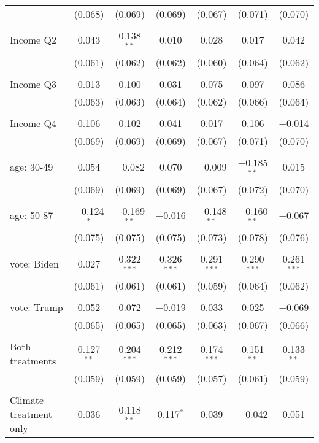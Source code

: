 \begin{tabular}{@{\extracolsep{5pt}}lcccccc}
  & (0.068) & (0.069) & (0.069) & (0.067) & (0.071) & (0.070) \\ 
  & & & & & & \\ 
 Income Q2 & 0.043 & 0.138$^{**}$ & 0.010 & 0.028 & 0.017 & 0.042 \\ 
  & (0.061) & (0.062) & (0.062) & (0.060) & (0.064) & (0.062) \\ 
  & & & & & & \\ 
 Income Q3 & 0.013 & 0.100 & 0.031 & 0.075 & 0.097 & 0.086 \\ 
  & (0.063) & (0.063) & (0.064) & (0.062) & (0.066) & (0.064) \\ 
  & & & & & & \\ 
 Income Q4 & 0.106 & 0.102 & 0.041 & 0.017 & 0.106 & $-$0.014 \\ 
  & (0.069) & (0.069) & (0.069) & (0.067) & (0.071) & (0.070) \\ 
  & & & & & & \\ 
 age: 30-49 & 0.054 & $-$0.082 & 0.070 & $-$0.009 & $-$0.185$^{**}$ & 0.015 \\ 
  & (0.069) & (0.069) & (0.069) & (0.067) & (0.072) & (0.070) \\ 
  & & & & & & \\ 
 age: 50-87 & $-$0.124$^{*}$ & $-$0.169$^{**}$ & $-$0.016 & $-$0.148$^{**}$ & $-$0.160$^{**}$ & $-$0.067 \\ 
  & (0.075) & (0.075) & (0.075) & (0.073) & (0.078) & (0.076) \\ 
  & & & & & & \\ 
 vote: Biden & 0.027 & 0.322$^{***}$ & 0.326$^{***}$ & 0.291$^{***}$ & 0.290$^{***}$ & 0.261$^{***}$ \\ 
  & (0.061) & (0.061) & (0.061) & (0.059) & (0.064) & (0.062) \\ 
  & & & & & & \\ 
 vote: Trump & 0.052 & 0.072 & $-$0.019 & 0.033 & 0.025 & $-$0.069 \\ 
  & (0.065) & (0.065) & (0.065) & (0.063) & (0.067) & (0.066) \\ 
  & & & & & & \\ 
 Both treatments & 0.127$^{**}$ & 0.204$^{***}$ & 0.212$^{***}$ & 0.174$^{***}$ & 0.151$^{**}$ & 0.133$^{**}$ \\ 
  & (0.059) & (0.059) & (0.059) & (0.057) & (0.061) & (0.059) \\ 
  & & & & & & \\ 
 Climate treatment only & 0.036 & 0.118$^{**}$ & 0.117$^{*}$ & 0.039 & $-$0.042 & 0.051 \\ 

\end{tabular}
